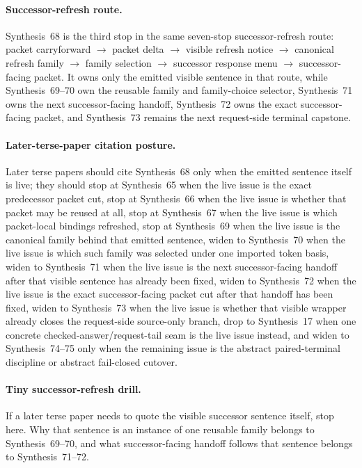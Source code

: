 \documentclass[11pt]{article}
\begin{document}
\paragraph{Successor-refresh route.}
Synthesis~68 is the third stop in the same seven-stop successor-refresh route: packet carryforward $\rightarrow$ packet delta $\rightarrow$ visible refresh notice $\rightarrow$ canonical refresh family $\rightarrow$ family selection $\rightarrow$ successor response menu $\rightarrow$ successor-facing packet.
It owns only the emitted visible sentence in that route, while Synthesis~69--70 own the reusable family and family-choice selector, Synthesis~71 owns the next successor-facing handoff, Synthesis~72 owns the exact successor-facing packet, and Synthesis~73 remains the next request-side terminal capstone.

\paragraph{Later-terse-paper citation posture.}
Later terse papers should cite Synthesis~68 only when the emitted sentence itself is live; they should stop at Synthesis~65 when the live issue is the exact predecessor packet cut, stop at Synthesis~66 when the live issue is whether that packet may be reused at all, stop at Synthesis~67 when the live issue is which packet-local bindings refreshed, stop at Synthesis~69 when the live issue is the canonical family behind that emitted sentence, widen to Synthesis~70 when the live issue is which such family was selected under one imported token basis, widen to Synthesis~71 when the live issue is the next successor-facing handoff after that visible sentence has already been fixed, widen to Synthesis~72 when the live issue is the exact successor-facing packet cut after that handoff has been fixed, widen to Synthesis~73 when the live issue is whether that visible wrapper already closes the request-side source-only branch, drop to Synthesis~17 when one concrete checked-answer/request-tail seam is the live issue instead, and widen to Synthesis~74--75 only when the remaining issue is the abstract paired-terminal discipline or abstract fail-closed cutover.

\paragraph{Tiny successor-refresh drill.}
If a later terse paper needs to quote the visible successor sentence itself, stop here. Why that sentence is an instance of one reusable family belongs to Synthesis~69--70, and what successor-facing handoff follows that sentence belongs to Synthesis~71--72.
\end{document}
